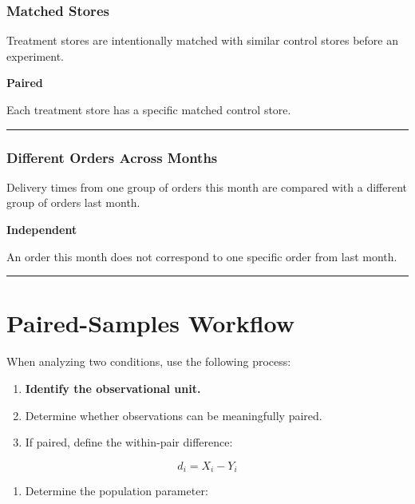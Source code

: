 \documentclass[
  letterpaper,
  DIV=11,
  numbers=noendperiod]{scrreprt}
\providecommand{\tightlist}{%
  \setlength{\itemsep}{0pt}\setlength{\parskip}{0pt}}
\begin{document}
\subsection{Matched Stores}\label{matched-stores}

Treatment stores are intentionally matched with similar control stores
before an experiment.

\textbf{Paired}

Each treatment store has a specific matched control store.

\begin{center}\rule{0.5\linewidth}{0.5pt}\end{center}

\subsection{Different Orders Across
Months}\label{different-orders-across-months}

Delivery times from one group of orders this month are compared with a
different group of orders last month.

\textbf{Independent}

An order this month does not correspond to one specific order from last
month.

\begin{center}\rule{0.5\linewidth}{0.5pt}\end{center}


\chapter{Paired-Samples Workflow}\label{paired-samples-workflow}

When analyzing two conditions, use the following process:

\begin{enumerate}
\def\labelenumi{\arabic{enumi}.}
\tightlist
\item
  \textbf{Identify the observational unit.}
\item
  Determine whether observations can be meaningfully paired.
\item
  If paired, define the within-pair difference:
\end{enumerate}

\[
d_i=X_i-Y_i
\]

\begin{enumerate}
\def\labelenumi{\arabic{enumi}.}
\setcounter{enumi}{3}
\tightlist
\item
  Determine the population parameter:
\end{enumerate}
\end{document}
